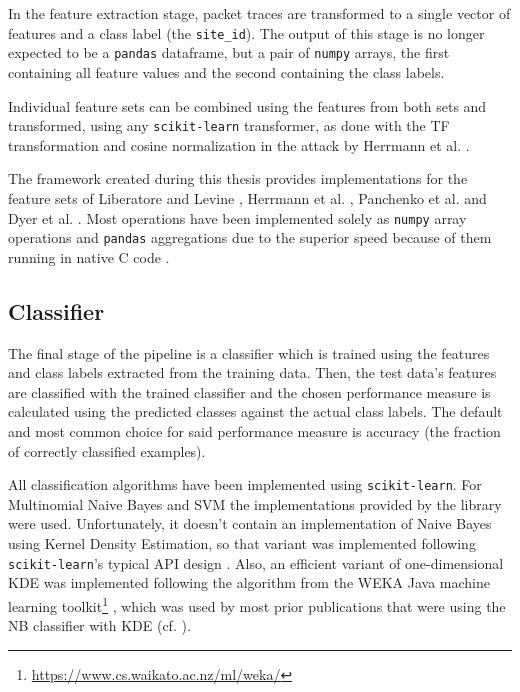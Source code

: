\documentclass[
	ruledheaders=chapter,
	class=report,
	thesis={type=master, department=inf},
	accentcolor=1c,
	custommargins=true,
	marginpar=false,
	parskip=half-,
	fontsize=11pt,
]{tudapub}
\begin{document}
	In the feature extraction stage, packet traces are transformed to a single vector of features and a class label (the \texttt{site\_id}). The output of this stage is no longer expected to be a \texttt{pandas} dataframe, but a pair of \texttt{numpy} arrays, the first containing all feature values and the second containing the class labels.
	
	Individual feature sets can be combined using the features from both sets and transformed, using any \texttt{scikit-learn} transformer, as done with the TF transformation and cosine normalization in the attack by Herrmann et al. \cite{Herrmann2009}.
	
	The framework created during this thesis provides implementations for the feature sets of Liberatore and Levine \cite{Liberatore2006}, Herrmann et al. \cite{Herrmann2009}, Panchenko et al. \cite{Panchenko2011, Panchenko2016} and Dyer et al. \cite{Dyer2012}. Most operations have been implemented solely as \texttt{numpy} array operations and \texttt{pandas} aggregations due to the superior speed because of them running in native C code \cite{Harris2020,McKinney2010}.
	
	\subsection{Classifier}
	
	The final stage of the pipeline is a classifier which is trained using the features and class labels extracted from the training data. Then, the test data's features are classified with the trained classifier and the chosen performance measure is calculated using the predicted classes against the actual class labels. The default and most common choice for said performance measure is accuracy (the fraction of correctly classified examples).
	
	All classification algorithms have been implemented using \texttt{scikit-learn}. For Multinomial Naive Bayes and SVM the implementations provided by the library were used. Unfortunately, it doesn't contain an implementation of Naive Bayes using Kernel Density Estimation, so that variant was implemented following \texttt{scikit-learn}'s typical API design \cite{Buitinck2013}. Also, an efficient variant of one-dimensional KDE was implemented following the algorithm from the WEKA Java machine learning toolkit\footnote{\url{https://www.cs.waikato.ac.nz/ml/weka/}} \cite{Frank2016}, which was used by most prior publications that were using the NB classifier with KDE (cf. \cite{Liberatore2006,Dyer2012}).
\end{document}
